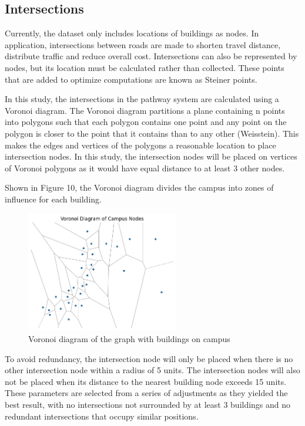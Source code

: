 \documentclass[11pt]{article}
\begin{document}
\subsection{Intersections}
Currently, the dataset only includes locations of buildings as nodes. In application, intersections between roads are made to shorten travel distance, distribute traffic and reduce overall cost. Intersections can also be represented by nodes, but its location must be calculated rather than collected. These points that are added to optimize computations are known as Steiner points. \par
	In this study, the intersections in the pathway system are calculated using a Voronoi diagram. The Voronoi diagram partitions a plane containing n points into polygons such that each polygon contains one point and any point on the polygon is closer to the point that it contains than to any other (Weisstein). This makes the edges and vertices of the polygons a reasonable location to place intersection nodes. In this study, the intersection nodes will be placed on vertices of Voronoi polygons as it would have equal distance to at least 3 other nodes. \par
Shown in Figure 10, the Voronoi diagram divides the campus into zones of influence for each building. \\
\begin{figure}[H]
\centering
\includegraphics[height=200px]{voronoi.png}
\caption{Voronoi diagram of the graph with buildings on campus}
\end{figure}
\par
To avoid redundancy, the intersection node will only be placed when there is no other intersection node within a radius of 5 units. The intersection nodes will also not be placed when its distance to the nearest building node exceeds 15 units. These parameters are selected from a series of adjustments as they yielded the best result, with no intersections not surrounded by at least 3 buildings and no redundant intersections that occupy similar positions.\\
\end{document}

